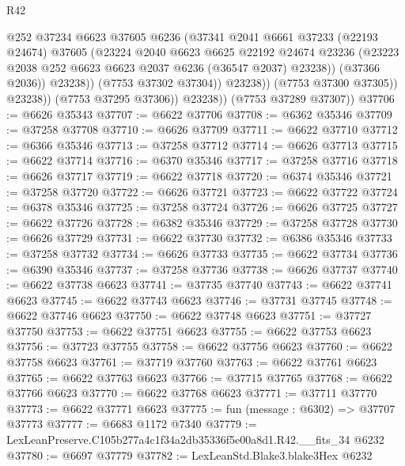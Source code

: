 \begin{lexlean}{R42}
\begin{coremodule}
{                            @252
                            @37234
                            @6623
                            @37605
                            @6236
                            (@37341
                              @2041
                              @6661
                              @37233
                              (@22193 @24674)
                              @37605
                              (@23224
                                @2040
                                @6623
                                @6625
                                @22192
                                @24674
                                @23236
                                (@23223 @2038 @252 @6623 @6623 @2037 @6236 (@36547 @2037) @23238))
                              (@37366 @2036))
                            @23238))
                        (@7753 @37302 @37304))
                      @23238))
                  (@7753 @37300 @37305))
                @23238))
            (@7753 @37295 @37306))
          @23238))
      (@7753 @37289 @37307))
@37706 := @6626 @35343
@37707 := @6622 @37706
@37708 := @6362 @35346
@37709 := @37258 @37708
@37710 := @6626 @37709
@37711 := @6622 @37710
@37712 := @6366 @35346
@37713 := @37258 @37712
@37714 := @6626 @37713
@37715 := @6622 @37714
@37716 := @6370 @35346
@37717 := @37258 @37716
@37718 := @6626 @37717
@37719 := @6622 @37718
@37720 := @6374 @35346
@37721 := @37258 @37720
@37722 := @6626 @37721
@37723 := @6622 @37722
@37724 := @6378 @35346
@37725 := @37258 @37724
@37726 := @6626 @37725
@37727 := @6622 @37726
@37728 := @6382 @35346
@37729 := @37258 @37728
@37730 := @6626 @37729
@37731 := @6622 @37730
@37732 := @6386 @35346
@37733 := @37258 @37732
@37734 := @6626 @37733
@37735 := @6622 @37734
@37736 := @6390 @35346
@37737 := @37258 @37736
@37738 := @6626 @37737
@37740 := @6622 @37738 @6623
@37741 := @37735 @37740
@37743 := @6622 @37741 @6623
@37745 := @6622 @37743 @6623
@37746 := @37731 @37745
@37748 := @6622 @37746 @6623
@37750 := @6622 @37748 @6623
@37751 := @37727 @37750
@37753 := @6622 @37751 @6623
@37755 := @6622 @37753 @6623
@37756 := @37723 @37755
@37758 := @6622 @37756 @6623
@37760 := @6622 @37758 @6623
@37761 := @37719 @37760
@37763 := @6622 @37761 @6623
@37765 := @6622 @37763 @6623
@37766 := @37715 @37765
@37768 := @6622 @37766 @6623
@37770 := @6622 @37768 @6623
@37771 := @37711 @37770
@37773 := @6622 @37771 @6623
@37775 := fun (message : @6302) => @37707 @37773
@37777 := @6683 @1172 @7340
@37779 := LexLeanPreserve.C105b277a4c1f34a2db35336f5e00a8d1.R42.__fits_34 @6232
@37780 := @6697 @37779
@37782 := LexLeanStd.Blake3.blake3Hex @6232
}
\end{coremodule}
\end{lexlean}
